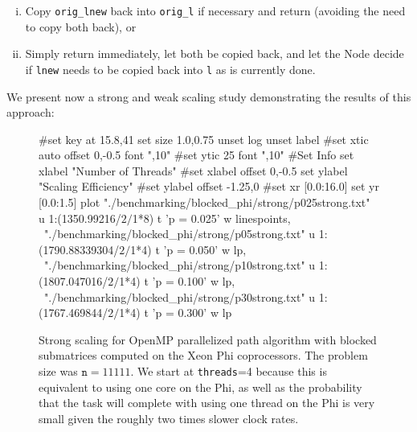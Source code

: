 \documentclass[11pt]{article}
\begin{document}
\begin{enumerate}[i)]
	\item Copy \texttt{orig\_lnew} back into \texttt{orig\_l} if necessary and return (avoiding the need to copy both back), or
	\item Simply return immediately, let both be copied back, and let the Node decide if \texttt{lnew} needs to be copied back into \texttt{l} as is currently done.
\end{enumerate}

\noindent We present now a strong and weak scaling study demonstrating the results of this approach:


\begin{figure}[h]
	\begin{center}
		\begin{gnuplot}[terminal=cairolatex, terminaloptions= color] 
			#set key at 15.8,41
			set size 1.0,0.75              
			unset log                          
			unset label                          
			#set xtic auto offset 0,-0.5 font ",10"                     
			#set ytic 25 font ",10" 
			#Set Info
			set xlabel "Number of Threads"
			#set xlabel offset 0,-0.5
			set ylabel "Scaling Efficiency"
			#set ylabel offset -1.25,0
			#set xr [0.0:16.0]
			set yr [0.0:1.5]
			plot "./benchmarking/blocked_phi/strong/p025strong.txt" u 1:(1350.99216/$2/$1*8) t 'p = 0.025' w linespoints, \
			"./benchmarking/blocked_phi/strong/p05strong.txt" u 1:(1790.88339304/$2/$1*4) t 'p = 0.050' w lp, \
			"./benchmarking/blocked_phi/strong/p10strong.txt" u 1:(1807.047016/$2/$1*4) t 'p = 0.100' w lp, \
			"./benchmarking/blocked_phi/strong/p30strong.txt" u 1:(1767.469844/$2/$1*4) t 'p = 0.300' w lp
		\end{gnuplot}
		\caption{Strong scaling for OpenMP parallelized path algorithm with blocked submatrices computed on the Xeon Phi coprocessors. The problem size was $\mathtt{n} = 11111$. We start at \texttt{threads}=4 because this is equivalent to using one core on the Phi, as well as the probability that the task will complete with using one thread on the Phi is very small given the roughly two times slower clock rates.}
		\label{blocked_device_ss}
	\end{center}
\end{figure}
\end{document}
